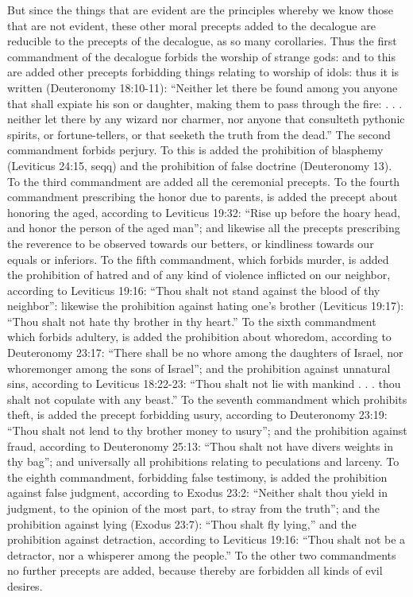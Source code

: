 But since the things that are evident are the principles whereby we know those that are not evident, these other moral precepts added to the decalogue are reducible to the precepts of the decalogue, as so many corollaries. Thus the first commandment of the decalogue forbids the worship of strange gods: and to this are added other precepts forbidding things relating to worship of idols: thus it is written (Deuteronomy 18:10-11): ``Neither let there be found among you anyone that shall expiate his son or daughter, making them to pass through the fire: . . . neither let there by any wizard nor charmer, nor anyone that consulteth pythonic spirits, or fortune-tellers, or that seeketh the truth from the dead.'' The second commandment forbids perjury. To this is added the prohibition of blasphemy (Leviticus 24:15, seqq) and the prohibition of false doctrine (Deuteronomy 13). To the third commandment are added all the ceremonial precepts. To the fourth commandment prescribing the honor due to parents, is added the precept about honoring the aged, according to Leviticus 19:32: ``Rise up before the hoary head, and honor the person of the aged man''; and likewise all the precepts prescribing the reverence to be observed towards our betters, or kindliness towards our equals or inferiors. To the fifth commandment, which forbids murder, is added the prohibition of hatred and of any kind of violence inflicted on our neighbor, according to Leviticus 19:16: ``Thou shalt not stand against the blood of thy neighbor'': likewise the prohibition against hating one's brother (Leviticus 19:17): ``Thou shalt not hate thy brother in thy heart.'' To the sixth commandment which forbids adultery, is added the prohibition about whoredom, according to Deuteronomy 23:17: ``There shall be no whore among the daughters of Israel, nor whoremonger among the sons of Israel''; and the prohibition against unnatural sins, according to Leviticus 18:22-23: ``Thou shalt not lie with mankind . . . thou shalt not copulate with any beast.'' To the seventh commandment which prohibits theft, is added the precept forbidding usury, according to Deuteronomy 23:19: ``Thou shalt not lend to thy brother money to usury''; and the prohibition against fraud, according to Deuteronomy 25:13: ``Thou shalt not have divers weights in thy bag''; and universally all prohibitions relating to peculations and larceny. To the eighth commandment, forbidding false testimony, is added the prohibition against false judgment, according to Exodus 23:2: ``Neither shalt thou yield in judgment, to the opinion of the most part, to stray from the truth''; and the prohibition against lying (Exodus 23:7): ``Thou shalt fly lying,'' and the prohibition against detraction, according to Leviticus 19:16: ``Thou shalt not be a detractor, nor a whisperer among the people.'' To the other two commandments no further precepts are added, because thereby are forbidden all kinds of evil desires.

